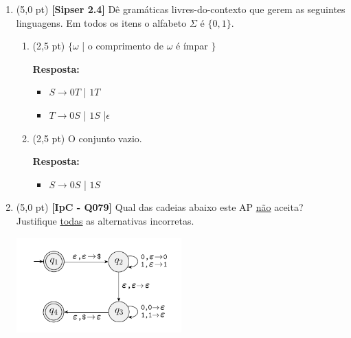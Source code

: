 \documentclass[12pt,a4paper,oneside]{article}
\begin{document}
\begin{enumerate}
	\section*{Mini-Teste 4}

	\item (5,0 pt) {\bf [Sipser 2.4]}  Dê gramáticas livres-do-contexto que gerem as seguintes linguagens. Em todos os itens o alfabeto $\Sigma$ é $\{0,1\}$.
	\begin{enumerate}
		\item (2,5 pt) $\{\omega$ | o comprimento de $\omega$ é ímpar $\}$
		
		\vspace*{0.3cm}
		
		{\color{blue} {\bf Resposta: }
			
		\begin{itemize}
			\item[] $S \rightarrow 0T$ | $1T$
			\item[] $T \rightarrow 0S$ | $1S$ |$\epsilon$
		\end{itemize}
		}
	
		\item (2,5 pt) O conjunto vazio.
		
		\vspace*{0.3cm}
		
		{\color{blue} {\bf Resposta: }
			
			\begin{itemize}
				\item[] $S \rightarrow 0S$ | $1S$
			\end{itemize}
		}
	
	\end{enumerate}

	\newpage

	\item (5,0 pt) {\bf [IpC - Q079]} Qual das cadeias abaixo este AP \underline{não} aceita? Justifique \underline{todas} as alternativas incorretas.
	
	\begin{center}
		\includegraphics[width=0.5\textwidth]{images/ap3}
	\end{center}


\end{enumerate}
\end{document}
